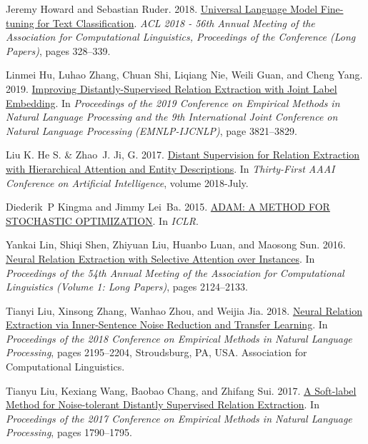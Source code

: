 \documentclass[11pt,a4paper]{article}
\begin{document}
\begin{thebibliography}{30}
Jeremy Howard and Sebastian Ruder. 2018.
\newblock \href {http://arxiv.org/abs/1801.06146} {{Universal Language Model
  Fine-tuning for Text Classification}}.
\newblock \emph{ACL 2018 - 56th Annual Meeting of the Association for
  Computational Linguistics, Proceedings of the Conference (Long Papers)},
  pages 328--339.

Linmei Hu, Luhao Zhang, Chuan Shi, Liqiang Nie, Weili Guan, and Cheng Yang.
  2019.
\newblock \href {https://doi.org/10.18653/v1/d19-1395} {{Improving
  Distantly-Supervised Relation Extraction with Joint Label Embedding}}.
\newblock In \emph{Proceedings of the 2019 Conference on Empirical Methods in
  Natural Language Processing and the 9th International Joint Conference on
  Natural Language Processing (EMNLP-IJCNLP)}, page 3821–3829.

Liu K. He S. {\&} Zhao~J. Ji, G. 2017.
\newblock \href {https://doi.org/10.1109/IJCNN.2018.8489631} {{Distant
  Supervision for Relation Extraction with Hierarchical Attention and Entity
  Descriptions}}.
\newblock In \emph{Thirty-First AAAI Conference on Artificial Intelligence},
  volume 2018-July.

Diederik~P Kingma and Jimmy Lei~Ba. 2015.
\newblock \href {https://arxiv.org/pdf/1412.6980.pdf} {{ADAM: A METHOD FOR
  STOCHASTIC OPTIMIZATION}}.
\newblock In \emph{ICLR}.

Yankai Lin, Shiqi Shen, Zhiyuan Liu, Huanbo Luan, and Maosong Sun. 2016.
\newblock \href {https://doi.org/10.18653/v1/p16-1200} {{Neural Relation
  Extraction with Selective Attention over Instances}}.
\newblock In \emph{Proceedings of the 54th Annual Meeting of the Association
  for Computational Linguistics (Volume 1: Long Papers)}, pages 2124--2133.

Tianyi Liu, Xinsong Zhang, Wanhao Zhou, and Weijia Jia. 2018.
\newblock \href {https://doi.org/10.18653/v1/d18-1243} {{Neural Relation
  Extraction via Inner-Sentence Noise Reduction and Transfer Learning}}.
\newblock In \emph{Proceedings of the 2018 Conference on Empirical Methods in
  Natural Language Processing}, pages 2195--2204, Stroudsburg, PA, USA.
  Association for Computational Linguistics.

Tianyu Liu, Kexiang Wang, Baobao Chang, and Zhifang Sui. 2017.
\newblock \href {https://doi.org/10.18653/v1/d17-1189} {{A Soft-label Method
  for Noise-tolerant Distantly Supervised Relation Extraction}}.
\newblock In \emph{Proceedings of the 2017 Conference on Empirical Methods in
  Natural Language Processing}, pages 1790--1795.


\end{thebibliography}
\end{document}
